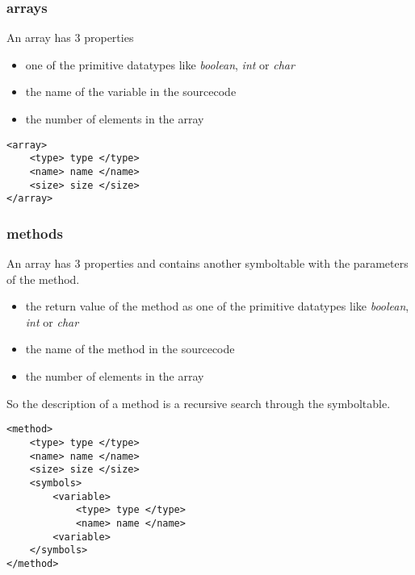 \subsubsection{arrays}
An array has 3 properties
\begin{itemize}
  \item one of the primitive datatypes like \emph{boolean}, \emph{int} or \emph{char}
  \item the name of the variable in the sourcecode
  \item the number of elements in the array
\end{itemize}

\begin{lstlisting}[caption={arrays}]
<array>
	<type> type </type>
	<name> name </name>
	<size> size </size>
</array>
\end{lstlisting}

\subsubsection{methods}
An array has 3 properties and contains another symboltable with the parameters
of the method. 
\begin{itemize}
  \item the return value of the method as one of the primitive datatypes
  like \emph{boolean}, \emph{int} or \emph{char}
  \item the name of the method in the sourcecode
  \item the number of elements in the array
\end{itemize}
So the description of a method is a recursive search through the symboltable.

\begin{lstlisting}[caption={methods}]
<method>
	<type> type </type>
	<name> name </name>
	<size> size </size>
	<symbols>
		<variable>
			<type> type </type>
			<name> name </name>
		<variable>
	</symbols>
</method>
\end{lstlisting}
